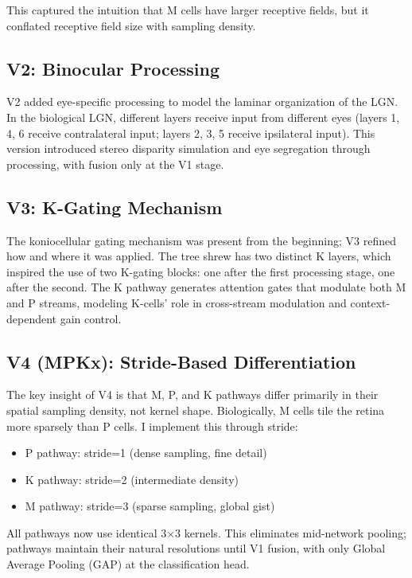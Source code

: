 \documentclass{article}
\begin{document}
This captured the intuition that M cells have larger receptive fields, but it conflated receptive field size with sampling density.

\subsection{V2: Binocular Processing}

V2 added eye-specific processing to model the laminar organization of the LGN. In the biological LGN, different layers receive input from different eyes (layers 1, 4, 6 receive contralateral input; layers 2, 3, 5 receive ipsilateral input). This version introduced stereo disparity simulation and eye segregation through processing, with fusion only at the V1 stage.

\subsection{V3: K-Gating Mechanism}

The koniocellular gating mechanism was present from the beginning; V3 refined how and where it was applied. The tree shrew has two distinct K layers, which inspired the use of two K-gating blocks: one after the first processing stage, one after the second. The K pathway generates attention gates that modulate both M and P streams, modeling K-cells' role in cross-stream modulation and context-dependent gain control.

\subsection{V4 (MPKx): Stride-Based Differentiation}

The key insight of V4 is that M, P, and K pathways differ primarily in their spatial sampling density, not kernel shape. Biologically, M cells tile the retina more sparsely than P cells. I implement this through stride:

\begin{itemize}
    \item P pathway: stride=1 (dense sampling, fine detail)
    \item K pathway: stride=2 (intermediate density)
    \item M pathway: stride=3 (sparse sampling, global gist)
\end{itemize}

All pathways now use identical 3$\times$3 kernels. This eliminates mid-network pooling; pathways maintain their natural resolutions until V1 fusion, with only Global Average Pooling (GAP) at the classification head.
\end{document}
